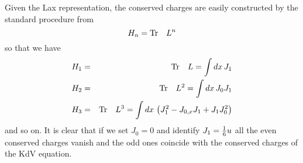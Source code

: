 \documentclass[a4paper,11pt]{article}
\begin{document}
Given the Lax representation, the conserved charges are easily
constructed by the standard procedure from
\begin{equation}
H_{n} = {\rm Tr}\quad L^{n}
\end{equation}
so that we have
\begin{eqnarray}
H_{1} & = & {\rm Tr}\quad L = \int dx\,J_{1}\nonumber\\
H_{2} & = & {\rm Tr}\quad L^{2} = \int dx\, J_{0}J_{1}\nonumber\\
H_{3} & = & {\rm Tr}\quad L^{3} = \int dx\, \left(J_{1}^{2} -
J_{0,x}J_{1} + J_{1} J_{0}^{2}\right)
\end{eqnarray}
and so on. It is clear that if we set $J_{0}=0$ and identify $J_{1} =
{1\over 6} u$ all the even conserved charges vanish and the odd ones
coincide with the conserved charges of the KdV equation.

\end{document}
